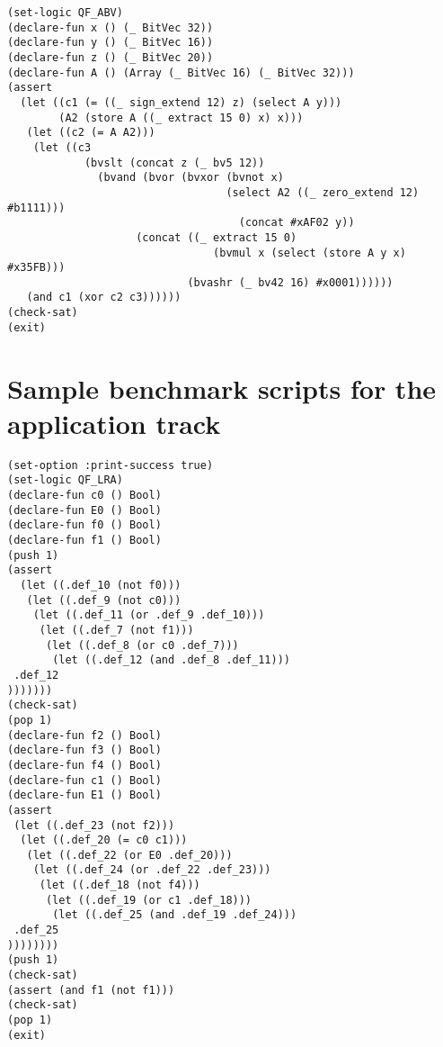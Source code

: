 \documentclass[12pt]{article}
\begin{document}

\footnotesize
\begin{verbatim}
(set-logic QF_ABV)
(declare-fun x () (_ BitVec 32))
(declare-fun y () (_ BitVec 16))
(declare-fun z () (_ BitVec 20))
(declare-fun A () (Array (_ BitVec 16) (_ BitVec 32)))
(assert
  (let ((c1 (= ((_ sign_extend 12) z) (select A y)))
        (A2 (store A ((_ extract 15 0) x) x)))
   (let ((c2 (= A A2)))
    (let ((c3 
            (bvslt (concat z (_ bv5 12)) 
              (bvand (bvor (bvxor (bvnot x) 
                                  (select A2 ((_ zero_extend 12) #b1111)))
                                    (concat #xAF02 y))
                    (concat ((_ extract 15 0) 
                                (bvmul x (select (store A y x) #x35FB))) 
                            (bvashr (_ bv42 16) #x0001))))))
   (and c1 (xor c2 c3))))))
(check-sat)
(exit)
\end{verbatim}

\section{Sample benchmark scripts for the application track}

\footnotesize
\begin{verbatim}
(set-option :print-success true)
(set-logic QF_LRA)
(declare-fun c0 () Bool)
(declare-fun E0 () Bool)
(declare-fun f0 () Bool)
(declare-fun f1 () Bool)
(push 1)
(assert 
  (let ((.def_10 (not f0)))
   (let ((.def_9 (not c0)))
    (let ((.def_11 (or .def_9 .def_10)))
     (let ((.def_7 (not f1)))
      (let ((.def_8 (or c0 .def_7)))
       (let ((.def_12 (and .def_8 .def_11)))
 .def_12
)))))))
(check-sat)
(pop 1)
(declare-fun f2 () Bool)
(declare-fun f3 () Bool)
(declare-fun f4 () Bool)
(declare-fun c1 () Bool)
(declare-fun E1 () Bool)
(assert 
 (let ((.def_23 (not f2)))
  (let ((.def_20 (= c0 c1)))
   (let ((.def_22 (or E0 .def_20)))
    (let ((.def_24 (or .def_22 .def_23)))
     (let ((.def_18 (not f4)))
      (let ((.def_19 (or c1 .def_18)))
       (let ((.def_25 (and .def_19 .def_24)))
 .def_25
))))))))
(push 1)
(check-sat)
(assert (and f1 (not f1)))
(check-sat)
(pop 1)
(exit)
\end{verbatim}
\end{document}
